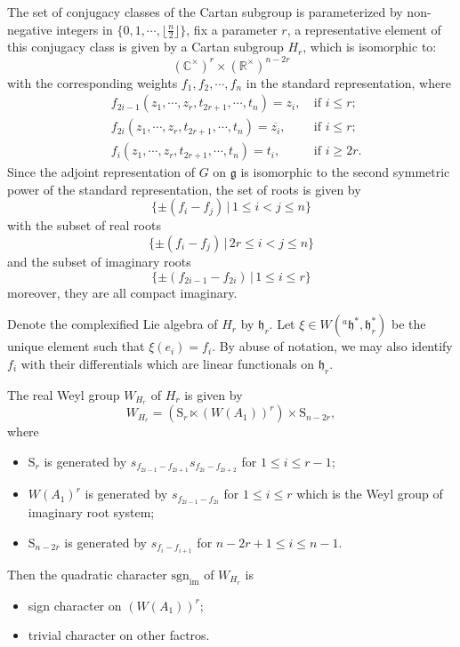 \documentclass[12pt, a4paper]{amsart}
\numberwithin{equation}{section}
\newcommand{\BC}{{\mathbb {C}}}
\newcommand{\BR}{{\mathbb {R}}}
\newcommand{\fg}{\mathfrak{g}}
\newcommand{\fh}{\mathfrak{h}}
\newcommand{\sgn}{{\mathrm{sgn}}}
\newcommand{\set}[2]{\{#1\,|\,#2\}}
\renewcommand{\bar}{\overline}
\begin{document}
The set of conjugacy classes of the Cartan subgroup is parameterized by non-negative integers in $\{0,1,\cdots,\lfloor \frac{n}{2}\rfloor\}$, fix a parameter $r$, a representative element of this conjugacy class is given by a Cartan subgroup $H_r$, which is isomorphic to:
$$(\BC^{\times})^r \times (\BR^{\times})^{n-2r}$$
with the corresponding weights $f_1,f_2,\cdots ,f_n$ in the standard representation, where
\begin{align}
    &f_{2i-1}(z_1,\cdots,z_r,t_{2r+1},\cdots,t_{n}) = z_i, \ & \textrm{if $i \leq r$};\\
    &f_{2i}(z_1,\cdots,z_r,t_{2r+1},\cdots,t_{n}) = \bar{z_i}, \ & \textrm{if $i \leq r$};\\
    &f_{i}(z_1,\cdots,z_r,t_{2r+1},\cdots,t_{n}) = t_i, \ & \textrm{if $i \geq 2r$}.
\end{align}
Since the adjoint representation of $G$ on $\fg$ is isomorphic to the second symmetric power of the standard representation, the set of roots is given by
$$\set{\pm (f_i - f_j)}{1 \leq i < j \leq n}$$
with the subset of real roots
$$\set{\pm(f_i - f_j)}{2r \leq i < j \leq n}$$
and the subset of imaginary roots
$$\set{\pm(f_{2i-1} - f_{2i})}{1 \leq i \leq r}$$
moreover, they are all compact imaginary. 

Denote the complexified Lie algebra of $H_r$ by $\fh_r$. Let $\xi \in W({^{a}\fh}^*,\fh_r^*)$ be the unique element such that $\xi(e_i) = f_i$. By abuse of notation, we may also identify $f_i$ with their differentials which are linear functionals on $\fh_r$.

The real Weyl group $W_{H_r}$ of $H_r$ is given by
$$W_{H_r} = (\mathrm{S}_r \ltimes  (W(A_1))^r) \times \mathrm{S}_{n-2r},$$
where 
\begin{itemize}
    \item $\mathrm{S}_r$ is generated by $s_{f_{2i-1}-f_{2i+1}}s_{f_{2i}-f_{2i+2}}$ for $1 \leq i \leq r-1$;
    \item $W(A_1)^r$ is generated by $s_{f_{2i-1}-f_{2i}}$ for $1 \leq i \leq r$ which is the Weyl group of imaginary root system;
    \item $\mathrm{S}_{n-2r}$ is generated by $s_{f_{i}-f_{i+1}}$ for $n-2r +1 \leq i \leq n-1$.
\end{itemize}

Then the quadratic character $\sgn_{\mathrm{im}}$ of $W_{H_r}$ is

\begin{itemize}
    \item sign character on $(W(A_1))^r$;
    \item trivial character on other factros.
\end{itemize}
\end{document}
